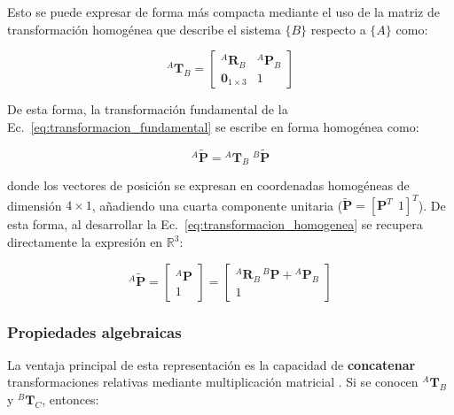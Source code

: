 Esto se puede expresar de forma más compacta mediante el uso de la matriz de transformación homogénea que describe el sistema $\{B\}$ respecto a $\{A\}$ \cite{craig2018robotics,siciliano2016springer} como:

\vspace{-0.5\baselineskip}
\begin{equation}
    {}^A\mathbf{T}_B = 
    \begin{bmatrix} 
        {}^A\bm{R}_B & {}^A\bm{P}_B\\ 
        \bm{0}_{1\times 3} & 1 
    \end{bmatrix}
    \label{eq:T_homogenea}
\end{equation}

De esta forma, la transformación fundamental de la Ec.~\ref{eq:transformacion_fundamental} se escribe en forma homogénea como:

\vspace{-0.5\baselineskip}
\begin{equation}
    {}^A\tilde{\bm{P}} = {}^A\mathbf{T}_B \; {}^B\tilde{\bm{P}}
    \label{eq:transformacion_homogenea}
\end{equation}

donde los vectores de posición se expresan en coordenadas homogéneas de dimensión $4\times1$, añadiendo una cuarta componente unitaria ($\tilde{\bm{P}} = [\bm{P}^T\ \ 1]^T$). De esta forma, al desarrollar la Ec.~\ref{eq:transformacion_homogenea} se recupera directamente la expresión en $\mathbb{R}^3$:

\vspace{-0.5\baselineskip}
\begin{equation}
    {}^A\tilde{\bm{P}}
    =
    \begin{bmatrix}
        {}^A\bm{P}\\
        1
    \end{bmatrix}
    =
    \begin{bmatrix}
        {}^A\bm{R}_B\,{}^B\bm{P} + {}^A\bm{P}_B\\
        1
    \end{bmatrix}
\end{equation}

\subsubsection{Propiedades algebraicas}

La ventaja principal de esta representación es la capacidad de \textbf{concatenar} transformaciones relativas mediante multiplicación matricial \cite{craig2018robotics,siciliano2016springer}. Si se conocen ${}^A\mathbf{T}_B$ y ${}^B\mathbf{T}_C$, entonces:

